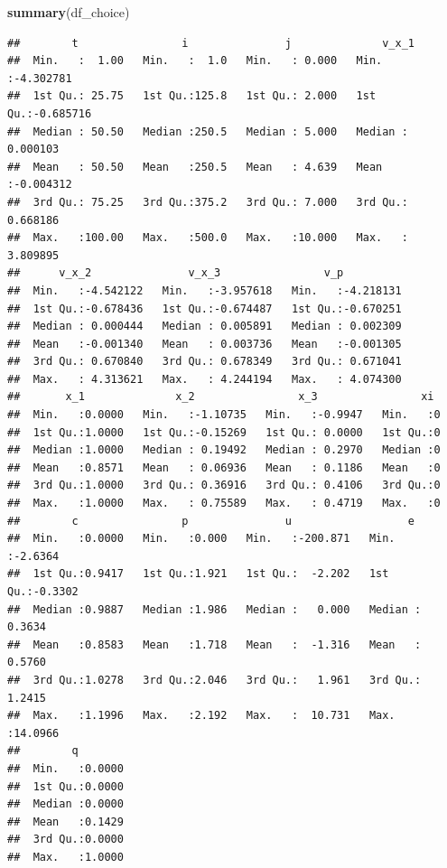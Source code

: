 \documentclass[]{book}
\newenvironment{Shaded}{\begin{snugshade}}{\end{snugshade}}
\newcommand{\KeywordTok}[1]{\textcolor[rgb]{0.13,0.29,0.53}{\textbf{#1}}}
\newcommand{\NormalTok}[1]{#1}
\begin{document}
\begin{Shaded}
\begin{Highlighting}[]
\KeywordTok{summary}\NormalTok{(df_choice)}
\end{Highlighting}
\end{Shaded}

\begin{verbatim}
##        t                i               j              v_x_1          
##  Min.   :  1.00   Min.   :  1.0   Min.   : 0.000   Min.   :-4.302781  
##  1st Qu.: 25.75   1st Qu.:125.8   1st Qu.: 2.000   1st Qu.:-0.685716  
##  Median : 50.50   Median :250.5   Median : 5.000   Median : 0.000103  
##  Mean   : 50.50   Mean   :250.5   Mean   : 4.639   Mean   :-0.004312  
##  3rd Qu.: 75.25   3rd Qu.:375.2   3rd Qu.: 7.000   3rd Qu.: 0.668186  
##  Max.   :100.00   Max.   :500.0   Max.   :10.000   Max.   : 3.809895  
##      v_x_2               v_x_3                v_p           
##  Min.   :-4.542122   Min.   :-3.957618   Min.   :-4.218131  
##  1st Qu.:-0.678436   1st Qu.:-0.674487   1st Qu.:-0.670251  
##  Median : 0.000444   Median : 0.005891   Median : 0.002309  
##  Mean   :-0.001340   Mean   : 0.003736   Mean   :-0.001305  
##  3rd Qu.: 0.670840   3rd Qu.: 0.678349   3rd Qu.: 0.671041  
##  Max.   : 4.313621   Max.   : 4.244194   Max.   : 4.074300  
##       x_1              x_2                x_3                xi   
##  Min.   :0.0000   Min.   :-1.10735   Min.   :-0.9947   Min.   :0  
##  1st Qu.:1.0000   1st Qu.:-0.15269   1st Qu.: 0.0000   1st Qu.:0  
##  Median :1.0000   Median : 0.19492   Median : 0.2970   Median :0  
##  Mean   :0.8571   Mean   : 0.06936   Mean   : 0.1186   Mean   :0  
##  3rd Qu.:1.0000   3rd Qu.: 0.36916   3rd Qu.: 0.4106   3rd Qu.:0  
##  Max.   :1.0000   Max.   : 0.75589   Max.   : 0.4719   Max.   :0  
##        c                p               u                  e          
##  Min.   :0.0000   Min.   :0.000   Min.   :-200.871   Min.   :-2.6364  
##  1st Qu.:0.9417   1st Qu.:1.921   1st Qu.:  -2.202   1st Qu.:-0.3302  
##  Median :0.9887   Median :1.986   Median :   0.000   Median : 0.3634  
##  Mean   :0.8583   Mean   :1.718   Mean   :  -1.316   Mean   : 0.5760  
##  3rd Qu.:1.0278   3rd Qu.:2.046   3rd Qu.:   1.961   3rd Qu.: 1.2415  
##  Max.   :1.1996   Max.   :2.192   Max.   :  10.731   Max.   :14.0966  
##        q         
##  Min.   :0.0000  
##  1st Qu.:0.0000  
##  Median :0.0000  
##  Mean   :0.1429  
##  3rd Qu.:0.0000  
##  Max.   :1.0000
\end{verbatim}
\end{document}
